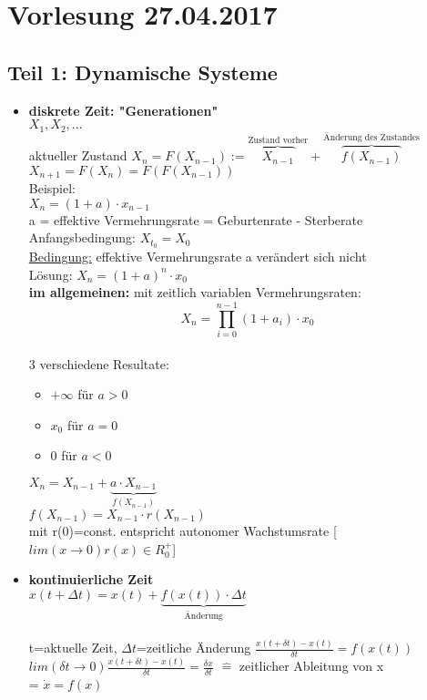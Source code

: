 \section{Vorlesung 27.04.2017}

\subsection{Teil 1: Dynamische Systeme}

\begin{itemize}
	\item \textbf{diskrete Zeit: "Generationen"}\\
	$X_1, X_2, ...$\\
	aktueller Zustand $X_n=F(X_{n-1}):=\overbrace{X_{n-1}}^{\text{Zustand vorher}} + \overbrace{f(X_{n-1})}^{\text{Änderung des Zustandes}}$\\
	$X_{n+1}=F(X_n)=F(F(X_{n-1}))$\\
	Beispiel:\\
	$X_n=(1+a) \cdot x_{n-1}$\\
	a = effektive Vermehrungsrate = Geburtenrate - Sterberate\\
	Anfangsbedingung: $X_{t_0}=X_0$\\
	\underline{Bedingung:} effektive Vermehrungsrate a verändert sich nicht\\
	Lösung: $X_n=(1+a)^n \cdot x_0$\\
	\textbf{im allgemeinen:} mit zeitlich variablen Vermehrungsraten:\\
	$$X_n=\prod \limits_{i=0}^{n-1} (1+a_i) \cdot x_0$$\\
	3 verschiedene Resultate:
	\begin{itemize}
		\item $+\infty$ für $a > 0$
		\item $x_0$ für $a=0$
		\item 0 für $a<0$
	\end{itemize}
	$X_n=X_{n-1} + \underbrace{a \cdot X_{n-1}}_{f(X_{n-1})}$\\
	$f(X_{n-1})=X_{n-1} \cdot r(X_{n-1})$\\
	mit r(0)=const. entspricht autonomer Wachstumsrate [$ lim (x \rightarrow 0) r(x) \in R_0^+$]
	\item \textbf{kontinuierliche Zeit}\\
	$x(t+\Delta t)=x(t) + \underbrace{f(x(t)) \cdot \Delta t}_{\text{Änderung}}$\\\\
	t=aktuelle Zeit, $\Delta t$=zeitliche Änderung
	$\displaystyle \frac{x(t+ \delta t) - x(t)}{\delta t} = f(x(t))$\\
	$lim (\delta t \rightarrow 0) \displaystyle \frac{x(t+ \delta t) - x(t)}{\delta t} = \frac{\delta x}{\delta t}$ $\widehat{=}$ zeitlicher Ableitung von x\\
	= $\dot{x}=f(x)$
\end{itemize}


